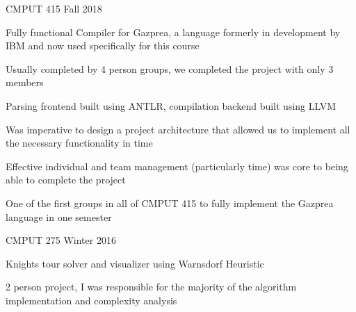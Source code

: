 
\begin{cventries}
  \cventry
    {} %
    {CMPUT 415} %
    {} %
    {Fall 2018} %
    {
      \begin{cvitems} %
      \item {Fully functional Compiler for Gazprea, a language formerly in development by IBM and now used specifically for this course}
      \item {Usually completed by 4 person groups, we completed the project with only 3 members}
      \item {Parsing frontend built using ANTLR, compilation backend built using LLVM}
      \item {Was imperative to design a project architecture that allowed us to implement all the necessary functionality in time}
      \item {Effective individual and team management (particularly time) was core to being able to complete the project}
      \item {One of the first groups in all of CMPUT 415 to fully implement the Gazprea language in one semester}
      \end{cvitems}
    }

  \cventry
    {} %
    {CMPUT 275} %
    {} %
    {Winter 2016} %
    {
      \begin{cvitems} %
      \item {Knights tour solver and visualizer using Warnsdorf Heuristic}
      \item {2 person project, I was responsible for the majority of the algorithm implementation and complexity analysis}
      \end{cvitems}
    }
\end{cventries}
